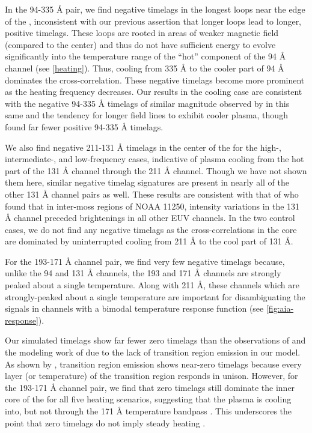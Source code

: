 In the 94-335 \AA{} pair, we find negative timelags in the longest loops near the edge of the \AR{}, inconsistent with our previous assertion that longer loops lead to longer, positive timelags. These loops are rooted in areas of weaker magnetic field (compared to the center) and thus do not have sufficient energy to evolve significantly into the temperature range of the ``hot'' component of the 94 \AA{} channel (see \autoref{heating}). Thus, cooling from 335 \AA{} to the cooler part of 94 \AA{} dominates the cross-correlation. These negative timelags become more prominent as the heating frequency decreases. Our results in the cooling case are consistent with the negative 94-335 \AA{} timelags of similar magnitude observed by \citet{viall_survey_2017} in this same \AR{} and the tendency for longer field lines to exhibit cooler plasma, though \citeauthor{viall_survey_2017} found far fewer positive 94-335 \AA{} timelags.

We also find negative 211-131 \AA{} timelags in the center of the \AR{} for the high-, intermediate-, and low-frequency cases, indicative of plasma cooling from the hot part of the 131 \AA{} channel through the 211 \AA{} channel. Though we have not shown them here, similar negative timelag signatures are present in nearly all of the other 131 \AA{} channel pairs as well. These results are consistent with that of \citet{cadavid_heating_2014} who found that in inter-moss regions of \AR{} NOAA 11250, intensity variations in the 131 \AA{} channel preceded brightenings in all other EUV channels. In the two control cases, we do not find any negative timelags as the cross-correlations in the core are dominated by uninterrupted cooling from 211 \AA{} to the cool part of 131 \AA{}.

For the 193-171 \AA{} channel pair, we find very few negative timelags because, unlike the 94 and 131 \AA{} channels, the 193 and 171 \AA{} channels are strongly peaked about a single temperature. Along with 211 \AA{}, these channels which are strongly-peaked about a single temperature are important for disambiguating the signals in channels with a bimodal temperature response function (see \autoref{fig:aia-response}).

Our simulated timelags show far fewer zero timelags than the observations of \citet{viall_evidence_2012,viall_survey_2017} and the modeling work of \citet{bradshaw_patterns_2016} due to the lack of transition region emission in our model. As shown by \citet{viall_transition_2015}, transition region emission shows near-zero timelags because every layer (or temperature) of the transition region responds in unison. However, for the 193-171 \AA{} channel pair, we find that zero timelags still dominate the inner core of the \AR{} for all five heating scenarios, suggesting that the plasma is cooling into, but not through the 171 \AA{} temperature bandpass \citep{viall_survey_2017}. This underscores the point that zero timelags do not imply steady heating \citep{viall_transition_2015,viall_signatures_2016}.

